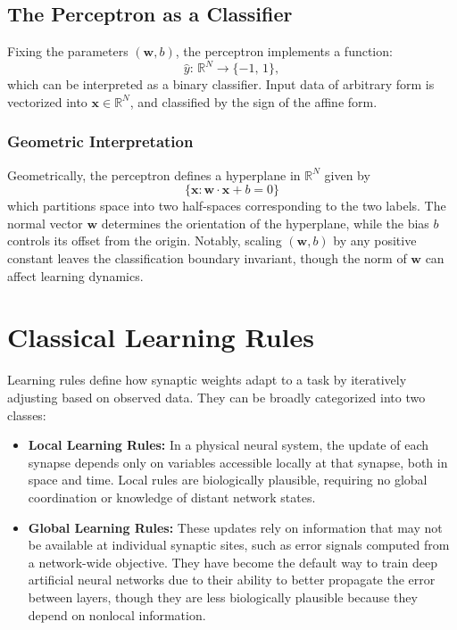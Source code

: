 \documentclass[a4paper,12pt]{report}
\begin{document}
\subsection*{The Perceptron as a Classifier}
Fixing the parameters $(\mathbf{w},b)$, the perceptron implements a function:
\[
  \hat y:\,\mathbb R^N \to \{ -1,\,1 \},
\]
which can be interpreted as a binary classifier. Input data of arbitrary form is vectorized into 
$\mathbf{x}\in\mathbb R^N$, and classified by the sign of the affine form.

\subsubsection*{Geometric Interpretation}
Geometrically, the perceptron defines a hyperplane in $\mathbb R^N$ given by
\[
    \{\mathbf{x}: \mathbf{w}\cdot\mathbf{x} + b = 0\}
\]
which partitions space into two half-spaces corresponding to the two labels. The normal vector 
$\mathbf{w}$ determines the orientation of the hyperplane, while the bias $b$ controls its offset from 
the origin. Notably, scaling $(\mathbf{w},b)$ by any positive constant leaves the classification 
boundary invariant, though the norm of $\mathbf{w}$ can affect learning dynamics.


\section{Classical Learning Rules}\label{sec:learning_rules}

Learning rules define how synaptic weights adapt to a task by iteratively adjusting based on observed data.
They can be broadly categorized into two classes:
\begin{itemize}
\item \textbf{Local Learning Rules:} In a physical neural system, the update of each synapse depends 
only on variables accessible locally at that synapse, both in space and time. \cite[Chapter~7]{Baldi2021}
Local rules are biologically plausible, requiring no global coordination or knowledge of distant 
network states.
\item \textbf{Global Learning Rules:} These updates rely on information that may not be available at 
individual synaptic sites, such as error signals computed from a network-wide objective. They have 
become the default way to train deep artificial neural networks due to their ability to better 
propagate the error between layers, though they are less biologically plausible because they depend on 
nonlocal information.
\end{itemize}
\end{document}
